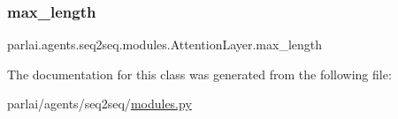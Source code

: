 \subsubsection{\texorpdfstring{max\+\_\+length}{max\_length}}
{\footnotesize\ttfamily parlai.\+agents.\+seq2seq.\+modules.\+Attention\+Layer.\+max\+\_\+length}



The documentation for this class was generated from the following file\+:\begin{DoxyCompactItemize}
\item 
parlai/agents/seq2seq/\hyperlink{parlai_2agents_2seq2seq_2modules_8py}{modules.\+py}\end{DoxyCompactItemize}

